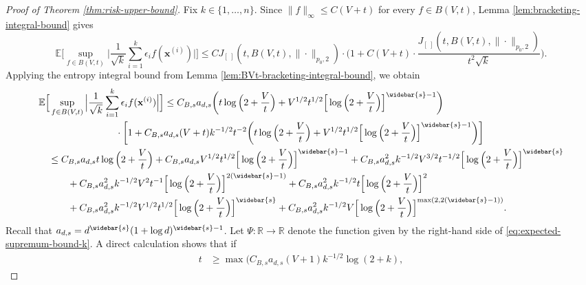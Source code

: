 \documentclass[10pt]{article}
\newcommand{\E}{{\mathbb E}}
\newcommand{\R}{{\mathbb R}}
\newcommand{\xbf}{{\mathbf{x}}}
\begin{document}
\begin{proof}[Proof of Theorem \ref{thm:risk-upper-bound}]
Fix $k \in \{1, \dots, n\}$.
Since $\|f\|_{\infty} \le C(V + t)$ for every $f \in B(V, t)$, 
Lemma \ref{lem:bracketing-integral-bound} gives
\begin{equation*}
    \E\Big[\sup_{f \in B(V, t)} \Big|\frac{1}{\sqrt{k}}
    \sum_{i = 1}^{k} \epsilon_i f(\xbf^{(i)})\Big|\Big]
    \le C J_{[ \ ]}(t, B(V, t), \| \cdot \|_{p_0, 2}) 
    \cdot \Big(1 + C(V + t) \cdot 
    \frac{J_{[ \ ]}(t, B(V, t), \| \cdot \|_{p_0, 2})}{t^2 \sqrt{k}}\Big).
\end{equation*}
Applying the entropy integral bound from 
Lemma \ref{lem:BVt-bracketing-integral-bound}, we obtain
\begin{align}\label{eq:expected-supremum-bound-k}
    &\E\Big[\sup_{f \in B(V, t)} \Big|\frac{1}{\sqrt{k}}
    \sum_{i = 1}^{k} \epsilon_i f(\xbf^{(i)})\Big|\Big]
    \le C_{B, s} a_{d, s} \bigg(t \log\Big(2 + \frac{V}{t}\Big)
    + V^{1/2} t^{1/2} 
    \Big[\log\Big(2 + \frac{V}{t}\Big)\Big]^{\widebar{s} - 1} \bigg) \nonumber \\
    &\qquad \qquad \qquad \qquad 
    \cdot \bigg[1 + C_{B, s} a_{d, s}(V + t)k^{-1/2}t^{-2} 
    \bigg(t \log\Big(2 + \frac{V}{t}\Big)
    + V^{1/2} t^{1/2} 
    \Big[\log\Big(2 + \frac{V}{t}\Big)\Big]^{\widebar{s} - 1}\bigg)\bigg] \nonumber \\
    &\quad \le 
    C_{B, s} a_{d, s} t \log\Big(2 + \frac{V}{t}\Big)
    + C_{B, s} a_{d, s} V^{1/2} t^{1/2} \Big[\log\Big(2 + \frac{V}{t}\Big)\Big]^{\widebar{s} - 1} 
    \nonumber + C_{B, s} a_{d, s}^2 k^{-1/2} V^{3/2} t^{-1/2} \Big[\log\Big(2 + \frac{V}{t}\Big)\Big]^{\widebar{s}} \\ 
    &\qquad \quad
    + C_{B, s} a_{d, s}^2 k^{-1/2} V^2 t^{-1} \Big[\log\Big(2 + \frac{V}{t}\Big)\Big]^{2(\widebar{s} - 1)} 
    + C_{B, s} a_{d, s}^2 k^{-1/2} t \Big[\log\Big(2 + \frac{V}{t}\Big)\Big]^2 \nonumber 
    \nonumber \\
    &\qquad \quad
    + C_{B, s} a_{d, s}^2 k^{-1/2} V^{1/2} t^{1/2} \Big[\log\Big(2 + \frac{V}{t}\Big)\Big]^{\widebar{s}} 
    + C_{B, s} a_{d, s}^2 k^{-1/2} V \Big[\log\Big(2 + \frac{V}{t}\Big)\Big]^{\max(2, 2(\widebar{s} - 1))}.
\end{align}
Recall that $a_{d, s} = d^{\widebar{s}}(1 + \log d)^{\widebar{s} - 1}$.
Let $\Psi: \R \to \R$ denote the function given by the right-hand side of
\eqref{eq:expected-supremum-bound-k}. 
A direct calculation shows that if
\begin{equation*}
\begin{aligned}
    t &\ge \max\Big(
    C_{B, s} a_{d, s} (V + 1) k^{-1/2} \log(2 + k),

\end{aligned}
\end{equation*}
\end{proof}
\end{document}

